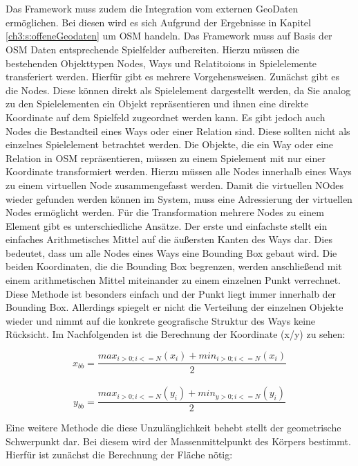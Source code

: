 \\\\
Das Framework muss zudem die Integration vom externen GeoDaten ermöglichen. Bei diesen wird es sich Aufgrund der Ergebnisse in Kapitel \ref{ch3:s:offeneGeodaten} um OSM handeln. Das Framework muss auf Basis der OSM Daten entsprechende Spielfelder aufbereiten. Hierzu müssen die bestehenden Objekttypen Nodes, Ways und Relatitoions in Spielelemente transferiert werden. Hierfür gibt es mehrere Vorgehensweisen.
Zunächst gibt es die Nodes. Diese können direkt als Spielelement dargestellt werden, da Sie analog zu den Spielelementen ein Objekt repräsentieren und ihnen eine direkte Koordinate auf dem Spielfeld zugeordnet werden kann. Es gibt jedoch auch Nodes die Bestandteil eines Ways oder einer Relation sind. Diese sollten nicht als einzelnes Spielelement betrachtet werden.
Die Objekte, die ein Way oder eine Relation in OSM repräsentieren, müssen zu einem Spielement mit nur einer Koordinate transformiert werden. Hierzu müssen alle Nodes innerhalb eines Ways zu einem \glqq virtuellen\grqq{} Node zusammengefasst werden.
Damit die virtuellen NOdes wieder gefunden werden können im System, muss eine Adressierung der virtuellen Nodes ermöglicht werden.
Für die Transformation mehrere Nodes zu einem Element gibt es unterschiedliche Ansätze. Der erste und einfachste stellt ein einfaches Arithmetisches Mittel auf die äußersten Kanten des Ways dar. Dies bedeutet, dass um alle Nodes eines Ways eine Bounding Box gebaut wird. Die beiden Koordinaten, die die Bounding Box begrenzen, werden anschließend mit einem arithmetischen Mittel miteinander zu einem einzelnen Punkt verrechnet. Diese Methode ist besonders einfach und der Punkt liegt immer innerhalb der Bounding Box. Allerdings spiegelt er nicht die Verteilung der einzelnen Objekte wieder und nimmt auf die konkrete geografische Struktur des Ways keine Rücksicht. Im Nachfolgenden ist die Berechnung der Koordinate (x/y) zu sehen:

\begin{equation}
x_{bb} = \frac{max_{i>0; i<=N}(x_i) + min_{i>0; i<=N}(x_i)}{2}
\end{equation}
\\
\begin{equation}
y_{bb} = \frac{max_{i>0; i<=N}(y_i) + min_{y>0; i<=N}(y_i)}{2}
\end{equation}

Eine weitere Methode die diese Unzulänglichkeit behebt stellt der geometrische Schwerpunkt dar.
Bei diesem wird der Massenmittelpunkt des Körpers bestimmt\cite{Papula.2006}. Hierfür ist zunächst die Berechnung der Fläche nötig:

